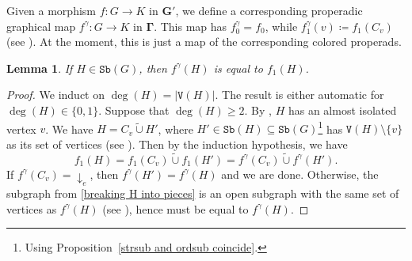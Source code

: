 \documentclass{amsart}
\numberwithin{theorem}{subsection}
\newtheorem{lemma}[theorem]{Lemma}
\theoremstyle{definition}
\newcommand{\bbY}{\mathbf{G}}
\newcommand{\hryGamma}{\mathbf{\Gamma}}
\newcommand{\sub}{\mathtt{Sb}}
\newcommand{\vertex}{\mathtt{V}}
\newcommand{\strcup}{\mathbin{\tilde \cup}}
\begin{document}
Given a morphism $f : G \to K$ in $\bbY'$, we define a corresponding properadic graphical map $f^\gamma : G \to K$ in $\hryGamma$.
This map has $f^\gamma_0 = f_0$, while $f^\gamma_1 (v) \coloneqq f_1(C_v)$ (see \cite[Lemma 5.19]{hrybook}).
At the moment, this is just a map of the corresponding colored properads.
\begin{lemma}\label{computing the image of falpha at a graph}
	If $H\in \sub(G)$, then $f^\gamma(H)$ is equal to $f_1(H)$.
\end{lemma}
\begin{proof}
We induct on $\deg(H) = \lvert\vertex(H)\rvert$. 
The result is either automatic for $\deg(H)\in\{ 0, 1\}$.
Suppose that $\deg(H) \geq 2$.
By \cite[Corollary 2.76]{hrybook}, $H$ has an almost isolated vertex $v$.
We have $H = C_v \strcup H'$, where $H' \in \sub(H) \subseteq \sub(G)$\footnote{Using Proposition~\ref{strsub and ordsub coincide}.} has $\vertex(H) \setminus \{v \}$ as its set of vertices (see \cite[Definition 2.60 \& \S 6.1.2]{hrybook}). 
Then by the induction hypothesis, we have
\begin{equation}\label{breaking H into pieces}
f_1(H) = f_1 (C_v) \strcup f_1(H') = f^\gamma(C_v) \strcup f^\gamma(H').
\end{equation}
If $f^\gamma(C_v) = {\downarrow_e}$, then $f^\gamma(H') = f^\gamma(H)$ and we are done.
Otherwise, the subgraph from \eqref{breaking H into pieces} is an open subgraph with the same set of vertices as $f^\gamma(H)$ (see \cite[Definition 6.40]{hrybook}), hence must be equal to $f^\gamma(H)$.
\end{proof}
\end{document}
